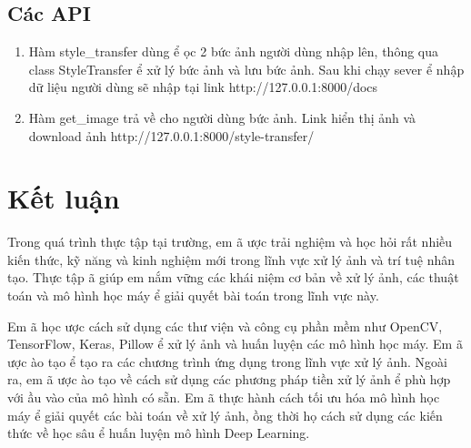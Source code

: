 \documentclass{article}
\begin{document}
\subsection{ C\'{a}c API}

\noindent 

\begin{enumerate}
\item  H\`{a}m style\_transfer d\`{u}ng {\dj}ể {\dj}ọc 2 bức ảnh người d\`{u}ng nhập l\^{e}n, th\^{o}ng qua class StyleTransfer {\dj}ể xử l\'{y} bức ảnh v\`{a} lưu bức ảnh. Sau khi chạy sever {\dj}ể nhập dữ liệu người d\`{u}ng sẽ nhập tại link http://127.0.0.1:8000/docs 

\item  H\`{a}m get\_image trả về cho người d\`{u}ng bức ảnh. Link hiển thị ảnh v\`{a} download ảnh http://127.0.0.1:8000/style-transfer/
\end{enumerate}

\noindent 

\noindent 


\section{ Kết luận}

\noindent 

\noindent 

\noindent Trong qu\'{a} tr\`{i}nh thực tập tại trường, em {\dj}\~{a} {\dj}ược trải nghiệm v\`{a} học hỏi rất nhiều kiến thức, kỹ n\u{a}ng v\`{a} kinh nghiệm mới trong l\~{i}nh vực xử l\'{y} ảnh v\`{a} tr\'{i} tuệ nh\^{a}n tạo. Thực tập {\dj}\~{a} gi\'{u}p em nắm vững c\'{a}c kh\'{a}i niệm cơ bản về xử l\'{y} ảnh, c\'{a}c thuật to\'{a}n v\`{a} m\^{o} h\`{i}nh học m\'{a}y {\dj}ể giải quyết b\`{a}i to\'{a}n trong l\~{i}nh vực n\`{a}y.

\noindent 

\noindent Em {\dj}\~{a} học {\dj}ược c\'{a}ch sử dụng c\'{a}c thư viện v\`{a} c\^{o}ng cụ phần mềm như OpenCV, TensorFlow, Keras, Pillow {\dj}ể xử l\'{y} ảnh v\`{a} huấn luyện c\'{a}c m\^{o} h\`{i}nh học m\'{a}y. Em {\dj}\~{a} {\dj}ược {\dj}\`{a}o tạo {\dj}ể tạo ra c\'{a}c chương tr\`{i}nh ứng dụng trong l\~{i}nh vực xử l\'{y} ảnh. Ngo\`{a}i ra, em {\dj}\~{a} {\dj}ược {\dj}\`{a}o tạo về c\'{a}ch sử dụng c\'{a}c phương ph\'{a}p tiền xử l\'{y} ảnh {\dj}ể ph\`{u} hợp với {\dj}ầu v\`{a}o của m\^{o} h\`{i}nh c\'{o} sẵn. Em {\dj}\~{a} thực h\`{a}nh c\'{a}ch tối ưu h\'{o}a m\^{o} h\`{i}nh học m\'{a}y {\dj}ể giải quyết c\'{a}c b\`{a}i to\'{a}n về xử l\'{y} ảnh, {\dj}ồng thời họ c\'{a}ch sử dụng c\'{a}c kiến thức về học s\^{a}u {\dj}ể huấn luyện m\^{o} h\`{i}nh Deep Learning.
\end{document}
